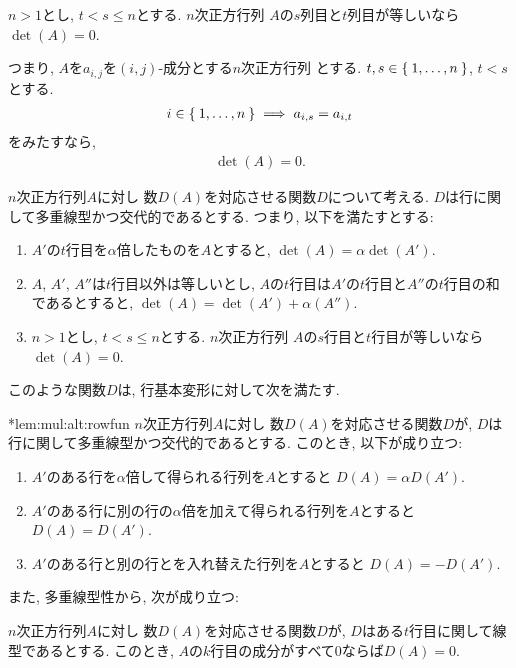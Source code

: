 \begin{theorem}
  $n>1$とし, $t<s\leq n$とする. 
  $n$次正方行列
  $A$の$s$列目と$t$列目が等しいなら$\det(A)=0$.

  つまり, 
  $A$を$a_{i,j}$を$(i,j)$-成分とする$n$次正方行列
  とする.
  $t, s\in\Set{1,\ldots,n}$, $t<s$とする. 
  \begin{align*}
    i\in\Set{1,\ldots,n}\implies a_{i,s}=a_{i,t}
  \end{align*}
  をみたすなら,
  \begin{align*}
    \det(A)=0.
  \end{align*}
\end{theorem}


$n$次正方行列$A$に対し
数$D(A)$を対応させる関数$D$について考える.
$D$は行に関して多重線型かつ交代的であるとする.
つまり, 以下を満たすとする:
\begin{enumerate}
\item
  $A'$の$t$行目を$\alpha$倍したものを$A$とすると,
  $\det(A)=\alpha\det(A')$.
\item
  $A$, $A'$, $A''$は$t$行目以外は等しいとし,
  $A$の$t$行目は$A'$の$t$行目と$A''$の$t$行目の和であるとすると,
  $\det(A)=\det(A')+\alpha(A'')$.
\item
  $n>1$とし, $t<s\leq n$とする. 
  $n$次正方行列
  $A$の$s$行目と$t$行目が等しいなら$\det(A)=0$.
\end{enumerate}
このような関数$D$は, 行基本変形に対して次を満たす.
\begin{lemma}
  \provelater**{lem:mul:alt:rowfun}
$n$次正方行列$A$に対し
  数$D(A)$を対応させる関数$D$が,
$D$は行に関して多重線型かつ交代的であるとする.
このとき, 以下が成り立つ:
\begin{enumerate}
\item
  $A'$のある行を$\alpha$倍して得られる行列を$A$とすると
  $D(A)=\alpha D(A')$.
\item
  $A'$のある行に別の行の$\alpha$倍を加えて得られる行列を$A$とすると
  $D(A)=D(A')$.
\item
  $A'$のある行と別の行とを入れ替えた行列を$A$とすると
  $D(A)=-D(A')$.
\end{enumerate}
\end{lemma}
また, 多重線型性から, 次が成り立つ:
\begin{lemma}
  $n$次正方行列$A$に対し
  数$D(A)$を対応させる関数$D$が,
  $D$はある$t$行目に関して線型であるとする.
  このとき, $A$の$k$行目の成分がすべて$0$ならば$D(A)=0$.
\end{lemma}
